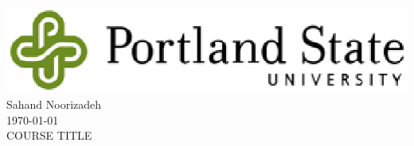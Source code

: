\documentclass[12pt]{article}
\begin{document}
\begin{titlepage}
\begin{center}

\setlength{\topskip}{3cm}
\center{\huge{\textsc{ -\\ }}}
\vspace{10 cm}
\includegraphics[scale=0.75, origin=c]{PSU-logo.eps} \\
\vspace{0.75 cm} 
\large{Sahand Noorizadeh } \\
\vspace{0.25 cm} 
\large \today \\
\vspace{1.5 cm}
COURSE TITLE
\end{center}
\end{titlepage}
\end{document}
